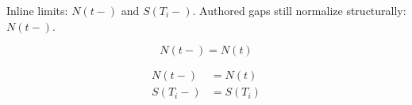 Inline limits: $N(t-)$ and $S(T_i-)$.
Authored gaps still normalize structurally: $N(t - )$.

\[
  N(t-)=N(t)
\]

\begin{align}
  N(t-)&=N(t) \\
  S(T_i-)&=S(T_i)
\end{align}
